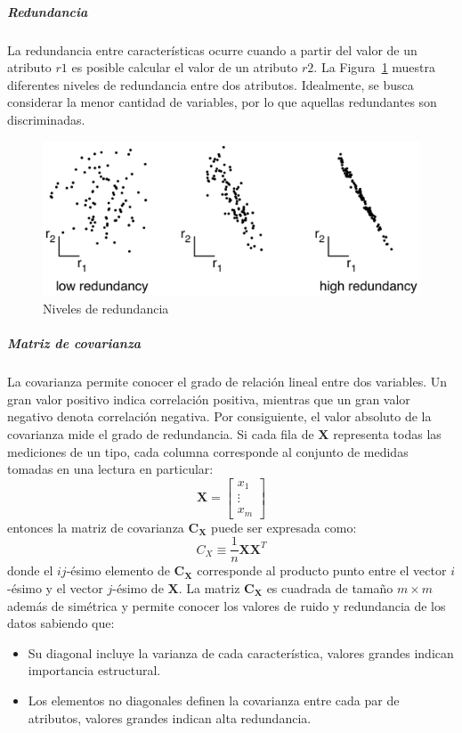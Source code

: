 \documentclass{article}
\begin{document}
\subparagraph{Redundancia}
\label{subp:redundancia}
La redundancia entre características ocurre cuando a partir del valor de un atributo $r1$ es posible calcular el valor de un atributo $r2$.
La Figura~\ref{fig:redundancia} muestra diferentes niveles de redundancia entre dos atributos.
Idealmente, se busca considerar la menor cantidad de variables, por lo que aquellas redundantes son discriminadas.
\begin{figure}
	\centering
	\includegraphics[width=\columnwidth]{resources/images/redundancia}
	\caption{Niveles de redundancia}
	\label{fig:redundancia}
\end{figure}

\subparagraph{Matriz de covarianza}
\label{subp:matriz_de_covarianza}
La covarianza permite conocer el grado de relación lineal entre dos variables.
Un gran valor positivo indica correlación positiva, mientras que un gran valor negativo denota correlación negativa.
Por consiguiente, el valor absoluto de la covarianza mide el grado de redundancia.
Si cada fila de $\mathbf{X}$ representa todas las mediciones de un tipo, cada columna corresponde al conjunto de medidas tomadas en una lectura en particular:
$$
\mathbf{X} = 
\begin{bmatrix}
x_1 \\
\vdots \\
x_m
\end{bmatrix}
$$
entonces la matriz de covarianza $\mathbf{C_X}$ puede ser expresada como:
$$
C_X \equiv \frac{1}{n}\mathbf{XX}^T
$$
donde el $ij$-ésimo elemento de $\mathbf{C_X}$ corresponde al producto punto entre el vector $i$-ésimo y el vector $j$-ésimo de $\mathbf{X}$.
La matriz $\mathbf{C_X}$ es cuadrada de tamaño $m \times m$ además de simétrica y permite conocer los valores de ruido y redundancia de los datos sabiendo que:
\begin{itemize}
	\item Su diagonal incluye la varianza de cada característica, valores grandes indican importancia estructural.
	\item Los elementos no diagonales definen la covarianza entre cada par de atributos, valores grandes indican alta redundancia.
\end{itemize}
\end{document}
